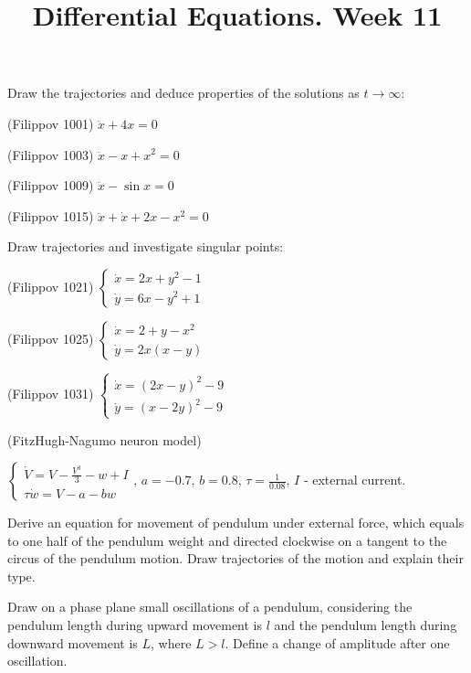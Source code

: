 \documentclass[14pt]{exam}
\title{Differential Equations. Week 11}
\date{}
\begin{document}
	\maketitle
	
	Draw the trajectories and deduce properties of the solutions as $t\to\infty$:
	
	\begin{questions}
		\question
		(Filippov 1001) 
		$\ddot{x} + 4x = 0$
		
		\question
		(Filippov 1003)
		$\ddot{x} -x + x^2 = 0$
		
		\question
		(Filippov 1009)
		$\ddot{x} - \sin x = 0$
		
		\question
		(Filippov 1015)
		$\ddot{x} + \dot{x} + 2x - x^2 = 0$
	\end{questions}
	
	Draw trajectories and investigate singular points:
	\begin{questions}
		\setcounter{question}{4}
		
		\question
		(Filippov 1021)
		$\begin{cases}
			\dot{x} = 2x + y^2 - 1\\
			\dot{y} = 6x - y^2 + 1
		\end{cases}$
		
		\question
		(Filippov 1025)
		$\begin{cases}
			\dot{x} = 2 + y - x^2\\
			\dot{y} = 2x(x - y)
		\end{cases}$
		
		\question
		(Filippov 1031)
		$\begin{cases}
			\dot{x} = (2x - y)^2 - 9\\
			\dot{y} = (x - 2y)^2 - 9
		\end{cases}$
		
		\question
		(FitzHugh-Nagumo neuron model)
		
		$\begin{cases}
			\dot{V} = V - \frac{V^3}{3} - w + I\\
			\tau\dot{w} = V - a - bw
		\end{cases}$,
		$a = -0.7$, $b = 0.8$, $\tau = \frac{1}{0.08}$, $I$ - external current.
		
		\question
		Derive an equation for movement of pendulum under
		external force, which equals to one half of the pendulum
		weight and directed clockwise on a tangent to the circus
		of the pendulum motion. Draw trajectories of the motion
		and explain their type.
		
		\question
		Draw on a phase plane small oscillations of a pendulum,
		considering the pendulum length during upward
		movement is $l$ and the pendulum length during downward
		movement is $L$, where $L > l$. Define a change of
		amplitude after one oscillation.
	\end{questions}
	
\end{document}
